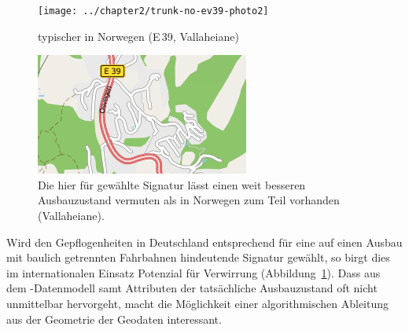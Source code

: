 \documentclass[../main/thesis.tex]{subfiles}
\begin{document}
\begin{figure}[ht]
  \begin{minipage}[t]{.5\linewidth}
    \centering
    \texttt{[image: ../chapter2/trunk-no-ev39-photo2]}
    \caption{typischer  in Norwegen (E\,39, Vallaheiane)}\label{fig:trunk-norway}
  \end{minipage}%
  \begin{minipage}[t]{.5\linewidth}
    \centering
    \includegraphics[width=\ScaleIfNeeded]{../chapter2/trunk-no-ev39-map1}
    \caption{Die hier für  gewählte Signatur lässt einen weit besseren Ausbauzustand vermuten als in Norwegen zum Teil vorhanden (Vallaheiane).}\label{fig:trunk-norway-osm-de}
  \end{minipage}
\end{figure}


Wird den Gepflogenheiten in Deutschland entsprechend für  eine auf einen Ausbau mit baulich getrennten Fahrbahnen hindeutende Signatur gewählt, so birgt dies im internationalen Einsatz Potenzial für Verwirrung (Abbildung~\ref{fig:trunk-norway-osm-de}).
Dass aus dem \osm-Datenmodell samt Attributen der tatsächliche Ausbauzustand oft nicht unmittelbar hervorgeht, macht die Möglichkeit einer algorithmischen Ableitung aus der Geometrie der Geodaten interessant.
\end{document}
